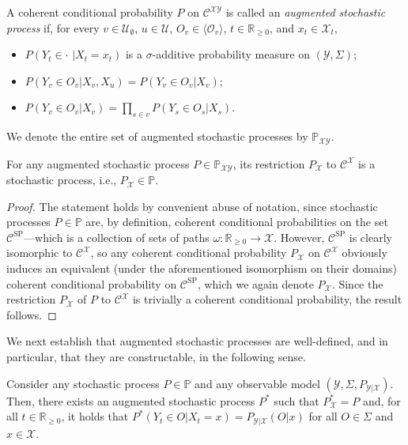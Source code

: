 \documentclass[twoside,11pt]{article}
\newcommand{\reals}{\mathbb{R}}
\newcommand{\realsnonneg}{\reals_{\geq 0}}
\newcommand{\states}{\mathcal{X}}
\newcommand{\observs}{\mathcal{Y}}
\newcommand{\processes}{\mathbb{P}}
\begin{document}
\begin{definition}\label{def:generating_process}
A coherent conditional probability $P$ on $\mathcal{C}^{\states\observs}$ is called an \emph{augmented stochastic process} if, for every $v\in\mathcal{U}_{\emptyset}$, $u\in\mathcal{U}$, $O_v\in\langle\mathcal{O}_v\rangle$, $t\in\realsnonneg$, and $x_t\in\states_t$,
\begin{itemize}
\item $P(Y_t\in \cdot\,\,\vert X_t=x_t)$ is a $\sigma$-additive probability measure on $(\observs,\Sigma)$;
\item $P(Y_v\in O_v\vert X_v,X_u)=P(Y_v\in O_v\vert X_v)$;
\item $P(Y_v\in O_v\vert X_v)=\prod_{s\in v}P(Y_s\in O_s\vert X_s)$.
\end{itemize}
We denote the entire set of augmented stochastic processes by $\mathbb{P}_{\states\observs}$.
\end{definition}

\begin{corollary}
For any augmented stochastic process $P\in\mathbb{P}_{\states\observs}$, its restriction $P_\states$ to $\mathcal{C}^\states$ is a stochastic process, i.e., $P_\states\in\processes$.
\end{corollary}
\begin{proof}
The statement holds by convenient abuse of notation, since stochastic processes $P\in\processes$ are, by definition, coherent conditional probabilities on the set $\mathcal{C}^\mathrm{SP}$---which is a collection of sets of paths $\omega:\realsnonneg\to\states$. However, $\mathcal{C}^\mathrm{SP}$ is clearly isomorphic to $\mathcal{C}^\states$, so any coherent conditional probability $P_\states$ on $\mathcal{C}^\states$ obviously induces an equivalent (under the aforementioned isomorphism on their domains) coherent conditional probability on $\mathcal{C}^\mathrm{SP}$, which we again denote $P_\states$. Since the restriction $P_\states$ of $P$ to $\mathcal{C}^\states$ is trivially a coherent conditional probability, the result follows.
\end{proof}

We next establish that augmented stochastic processes are well-defined, and in particular, that they are constructable, in the following sense.
\begin{proposition}\label{prop:generating_process_constructable}
Consider any stochastic process $P\in\processes$ and any observable model $(\observs,\Sigma,P_{\observs\vert\states})$. Then, there exists an augmented stochastic process $P^*$ such that $P^*_\states=P$ and, for all $t\in\realsnonneg$, it holds that $P^*(Y_t\in O\vert X_t=x)=P_{\observs\vert\states}(O\vert x)$ for all $O\in\Sigma$ and $x\in\states$.
\end{proposition}
\end{document}
